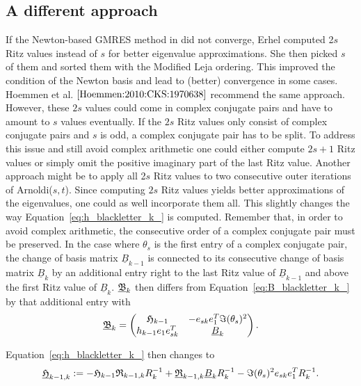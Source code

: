 \documentclass{scrartcl}
\numberwithin{equation}{section}
\begin{document}
\subsection{A different approach}
If the Newton-based GMRES method in \cite{Erhel95aparallel} did not converge, Erhel computed 2$s$ Ritz values instead of $s$ for better eigenvalue approximations. She then picked $s$ of them and sorted them with the Modified Leja ordering. This improved the condition of the Newton basis and lead to (better) convergence in some cases. Hoemmen et al. $\cite{Hoemmen:2010:CKS:1970638}$ recommend the same approach. However, these $2s$ values could come in complex conjugate pairs and have to amount to $s$ values eventually. If the $2s$ Ritz values only consist of complex conjugate pairs and $s$ is odd, a complex conjugate pair has to be split. To address this issue and still avoid complex arithmetic one could either compute $2s + 1$ Ritz values or simply omit the positive imaginary part of the last Ritz value. Another approach might be to apply all 2$s$ Ritz values to two consecutive outer iterations of Arnoldi($s,t$). Since computing $2s$ Ritz values yields better approximations of the eigenvalues, one could as well incorporate them all. This slightly changes the way Equation~\eqref{eq:h_blackletter_k_} is computed. Remember that, in order to avoid complex arithmetic, the consecutive order of a complex conjugate pair must be preserved. In the case where $\theta_s$ is the first entry of a complex conjugate pair, the change of basis matrix $\underline{B}_{k - 1 }$ is connected to its consecutive change of basis matrix $\underline{B}_{k}$ by an additional entry right to the last Ritz value of $\underline{B}_{k - 1}$ and above the first Ritz value of $\underline{B}_k$. $\underline{\frak{B}}_k$ then differs from Equation~\eqref{eq:B_blackletter_k_} by that additional entry with
\begin{equation}
\underline{\frak{B}}_{k} = 
\begin{pmatrix}
	\frak{H}_{k - 1} & -e_{sk} e^T_1 \Im (\theta_s)^2 \\
	h_{k - 1} e_1 e^T_{sk} & \underline{B}_k
\end{pmatrix}.
\end{equation}

Equation~\eqref{eq:h_blackletter_k_} then changes to
\begin{equation}
\underline{\frak{H}}_{k - 1, k} := -\frak{H}_{k - 1} \frak{R}_{k - 1, k} R^{-1}_k + \underline{\frak{R}}_{k - 1, k} \underline{B}_k R^{-1}_k - \Im (\theta_s)^2 e_{sk} e^T_1  R^{-1}_{k}.
\end{equation}
\end{document}
